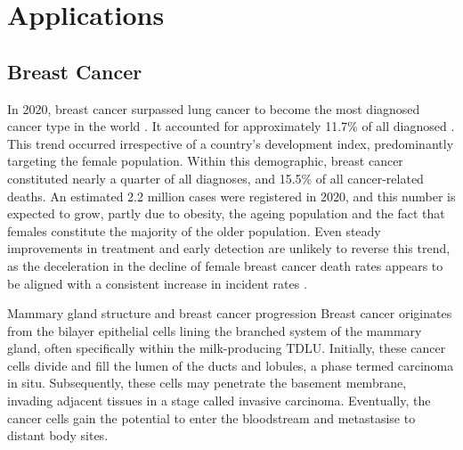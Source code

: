 \chapter{Applications}
\label{sec:chapter-basiss-applications}

\section{Breast Cancer}

In 2020, breast cancer surpassed lung cancer to become the most diagnosed cancer type in the world \parencite{Sung2021-xv}. It accounted for approximately 11.7\% of all diagnosed . This trend occurred irrespective of a country's development index, predominantly targeting the female population. Within this demographic, breast cancer constituted nearly a quarter of all diagnoses, and 15.5\% of all cancer-related deaths. An estimated 2.2 million cases were registered in 2020, and this number is expected to grow, partly due to obesity, the ageing population and the fact that females constitute the majority of the older population. Even steady improvements in treatment and early detection are unlikely to reverse this trend, as the deceleration in the decline of female breast cancer death rates appears to be aligned with a consistent increase in incident rates \parencite{Cronin2022-mc}.

    {Mammary gland structure and breast cancer progression}
    {Breast cancer originates from the bilayer epithelial cells lining the branched system of the mammary gland, often specifically within the milk-producing \acf{TDLU}. Initially, these cancer cells divide and fill the lumen of the ducts and lobules, a phase termed carcinoma in situ. Subsequently, these cells may penetrate the basement membrane, invading adjacent tissues in a stage called invasive carcinoma. Eventually, the cancer cells gain the potential to enter the bloodstream and metastasise to distant body sites.}

